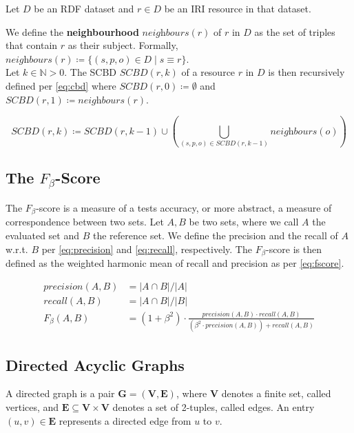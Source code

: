 Let $D$ be an \ac{RDF} dataset and $r\in D$ be an \ac{IRI} resource in that dataset.

We define the \textbf{neighbourhood} $\textit{neighbours}(r)$ of $r$ in $D$ as the set of triples that contain $r$ as their subject.
Formally, $\textit{neighbours}(r) \coloneq \{ (s, p, o) \in D \mid s \equiv r \}$.\\

Let $k\in\mathbb{N} > 0$.
The \ac{SCBD} $\textit{SCBD}(r, k)$ of a resource $r$ in $D$ is then recursively defined per \autoref{eq:cbd} where $\textit{SCBD}(r, 0) \coloneq \emptyset$ and $\textit{SCBD}(r, 1) \coloneq \textit{neighbours}(r)$.

\begin{equation}
  \textit{SCBD}(r, k) \coloneq \textit{SCBD}(r, k-1) \cup \left( \bigcup_{(s, p, o) \in \textit{SCBD}(r, k-1)} \textit{neighbours}(o) \right)
  \label{eq:cbd}
\end{equation}

\subsection{The \texorpdfstring{$F_\beta$}{F-beta}-Score}
\label{ssec:fscore}
The $F_\beta$-score is a measure of a tests accuracy, or more abstract, a measure of correspondence between two sets.
Let $A, B$ be two sets, where we call $A$ the evaluated set and $B$ the reference set.
We define the precision and the recall of $A$ w.r.t. $B$ per \autoref{eq:precision} and \autoref{eq:recall}, respectively.
The $F_\beta$-score is then defined as the weighted harmonic mean of recall and precision as per \autoref{eq:fscore}.

\begin{align}
\textit{precision}(A,B) & = |A\cap B|/|A| \label{eq:precision} \\
\textit{recall}(A,B) & = |A\cap B|/|B| \label{eq:recall} \\ 
 F_\beta(A,B) & =  (1 + \beta^2) \cdot \frac{\textit{precision}(A,B) \cdot \textit{recall}(A,B)}{(\beta^2 \cdot \textit{precision}(A,B)) + \textit{recall}(A,B)}  \label{eq:fscore}
\end{align}


\subsection{Directed Acyclic Graphs}

A directed graph is a pair $\mathbf{G}=(\mathbf{V},\mathbf{E})$, where $\mathbf{V}$ denotes a finite set, called vertices, and $\mathbf{E}\subseteq \mathbf{V} \times \mathbf{V}$ denotes a set of 2-tuples, called edges.
An entry $(u,v)\in \mathbf{E}$ represents a directed edge from $u$ to $v$.

